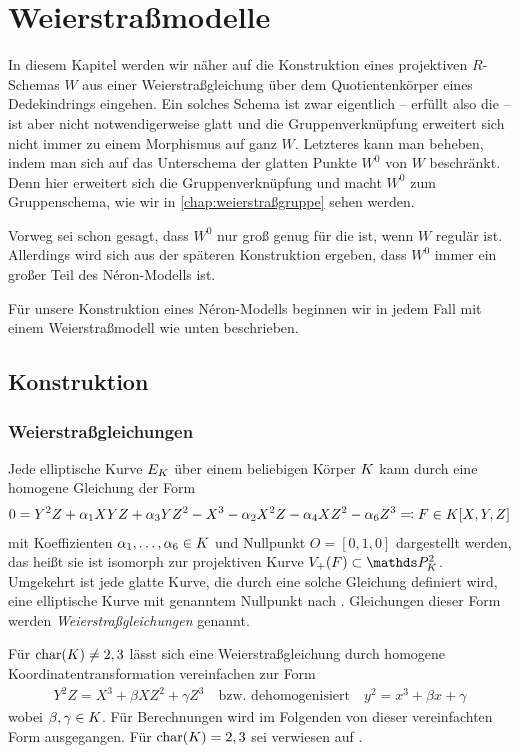 \chapter{Weierstraßmodelle}\label{chap:weierstraßmodelle}
In diesem Kapitel werden wir näher auf die Konstruktion eines
projektiven $R$-Schemas $W$ aus einer Weierstraßgleichung über dem
Quotientenkörper eines Dedekindrings eingehen.
Ein solches Schema ist zwar eigentlich – erfüllt also die \NAbbEig – ist
aber nicht notwendigerweise glatt und die Gruppenverknüpfung
erweitert sich nicht immer zu einem Morphismus auf ganz $W$.
Letzteres kann man beheben, indem man sich auf das Unterschema der
glatten Punkte $W^0$ von $W$ beschränkt. Denn hier erweitert sich die
Gruppenverknüpfung und macht $W^0$ zum Gruppenschema, wie wir in
\autoref{chap:weierstraßgruppe} sehen werden.

Vorweg sei schon gesagt, dass $W^0$ nur groß genug für die
\NAbbEig ist, wenn $W$ regulär ist. Allerdings wird sich aus
der späteren Konstruktion ergeben, dass $W^0$ immer ein großer Teil
des Néron-Modells ist.

Für unsere Konstruktion eines Néron-Modells beginnen wir in jedem Fall
mit einem Weierstraßmodell wie unten beschrieben.

\section{Konstruktion}
\subsection{Weierstraßgleichungen}
Jede elliptische Kurve $E_{K}$ über einem beliebigen Körper $K$ kann
durch eine homogene Gleichung der Form
\begin{gather*}
  0 = Y^2 Z + \alpha_1 XYZ + \alpha_3 YZ^2 - X^3 - \alpha_2X^2 Z - \alpha_4 XZ^2 - \alpha_6 Z^3
  \eqqcolon F\in K[X,Y,Z]
\end{gather*}
mit Koeffizienten $\alpha_1,\dotsc,\alpha_6\in K$ und Nullpunkt $O=[0,1,0]$
dargestellt werden, das heißt sie ist isomorph zur projektiven Kurve
$V_+(F)\subset\P_\K^2$.
Umgekehrt ist jede glatte Kurve, die durch eine
solche Gleichung definiert wird, eine elliptische Kurve mit genanntem
Nullpunkt nach \cite[Proposition III.3.1]{silverman}.
Gleichungen dieser Form werden \emph{Weierstraßgleichungen} genannt.

Für $\operatorname{char}(K)\neq 2,3$ lässt sich eine Weierstraßgleichung durch
homogene Koordinatentransformation vereinfachen zur Form
\begin{gather*}
  Y^2 Z = X^3 + \beta XZ^2 + \gamma Z^3
  \quad\text{bzw. dehomogenisiert}\quad
  y^2 = x^3 + \beta x + \gamma
\end{gather*}
wobei $\beta,\gamma\in K$.
Für Berechnungen wird im Folgenden von dieser vereinfachten Form
ausgegangen. Für $\operatorname{char}(K)=2,3$ sei verwiesen auf
\cite[Appendix: Elliptic Curves in Characteristics 2 and 3]{silverman}.


